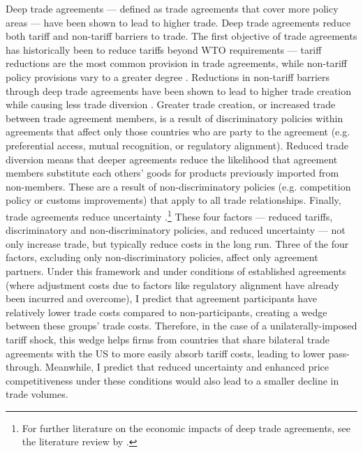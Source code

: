 Deep trade agreements --- defined as trade agreements that cover more policy areas --- have been shown to lead to higher trade. Deep trade agreements reduce both tariff and non-tariff barriers to trade. The first objective of trade agreements has historically been to reduce tariffs beyond WTO requirements --- tariff reductions are the most common provision in trade agreements, while non-tariff policy provisions vary to a greater degree \autocite{hofmann2017}. Reductions in non-tariff barriers through deep trade agreements have been shown to lead to higher trade creation while causing less trade diversion \autocite{mattooTradeCreationTrade2022}. Greater trade creation, or increased trade between trade agreement members, is a result of discriminatory policies within agreements that affect only those countries who are party to the agreement (e.g. preferential access, mutual recognition, or regulatory alignment). Reduced trade diversion means that deeper agreements reduce the likelihood that agreement members substitute each others' goods for products previously imported from non-members. These are a result of non-discriminatory policies (e.g. competition policy or customs improvements) that apply to all trade relationships. Finally, trade agreements reduce uncertainty \autocite{TPU_literature_review, carballo2022}.\footnote{For further literature on the economic impacts of deep trade agreements, see the literature review by \textcite{fernandes2021}.} These four factors --- reduced tariffs, discriminatory and non-discriminatory policies, and reduced uncertainty --- not only increase trade, but typically reduce costs in the long run. Three of the four factors, excluding only non-discriminatory policies, affect only agreement partners. Under this framework and under conditions of established agreements (where adjustment costs due to factors like regulatory alignment have already been incurred and overcome), I predict that agreement participants have relatively lower trade costs compared to non-participants, creating a wedge between these groups' trade costs. Therefore, in the case of a unilaterally-imposed tariff shock, this wedge helps firms from countries that share bilateral trade agreements with the US to more easily absorb tariff costs, leading to lower pass-through. Meanwhile, I predict that reduced uncertainty and enhanced price competitiveness under these conditions would also lead to a smaller decline in trade volumes.

